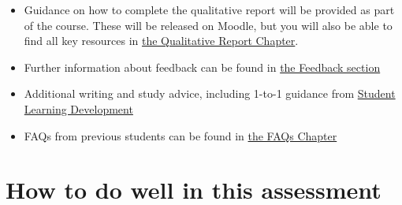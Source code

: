 \documentclass[
  english,
  letterpaper,
  DIV=11,
  numbers=noendperiod]{scrreprt}
\begin{document}
\begin{itemize}
\item
  Guidance on how to complete the qualitative report will be provided as
  part of the course. These will be released on Moodle, but you will
  also be able to find all key resources in
  \hyperref[ch12_qualitative_report]{the Qualitative Report Chapter}.
\item
  Further information about feedback can be found in
  \hyperref[report_feedback]{the Feedback section}
\item
  Additional writing and study advice, including 1-to-1 guidance from
  \href{https://www.gla.ac.uk/myglasgow/sld/}{Student Learning
  Development}
\item
  FAQs from previous students can be found in \hyperref[ch13_faqs]{the
  FAQs Chapter}
\end{itemize}

\section{How to do well in this
assessment}\label{how-to-do-well-in-this-assessment-3}
\end{document}
